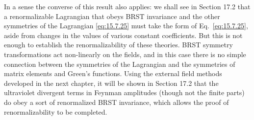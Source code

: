 In a sense the converse of this result also applies: we shall see in Section 17.2 that a renormalizable Lagrangian that obeys BRST invariance and the other symmetries of the Lagrangian \eqref{eq:15.7.25} must take the form of Eq.~\eqref{eq:15.7.25}, aside from changes in the values of various constant coefficients. But this is not enough to establish the renormalizability of these theories. BRST symmetry transformations act non-linearly on the fields, and in this case there is no simple connection between the symmetries of the Lagrangian and the symmetries of matrix elements and Green's functions. Using the external field methods developed in the next chapter, it will be shown in Section 17.2 that the ultraviolet divergent terms in Feynman amplitudes (though not the finite parts) do obey a sort of renormalized BRST invariance, which allows the proof of renormalizability to be completed.

